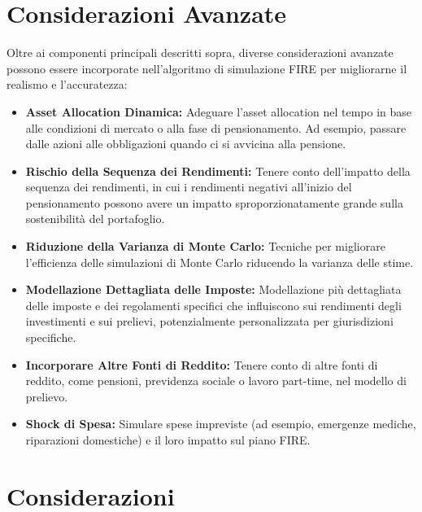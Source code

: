\documentclass{article}
\begin{document}
    \section{Considerazioni Avanzate}\label{sec:considerazioni-avanzate}

Oltre ai componenti principali descritti sopra, diverse considerazioni avanzate
possono essere incorporate nell'algoritmo di simulazione FIRE per migliorarne il
realismo e l'accuratezza:
    \begin{itemize}
        \item \textbf{Asset Allocation Dinamica:} Adeguare l'asset allocation
        nel tempo in base alle condizioni di mercato o alla fase di
        pensionamento.
        Ad esempio, passare dalle azioni alle obbligazioni quando
        ci si avvicina alla pensione.
        \item \textbf{Rischio della Sequenza dei Rendimenti:} Tenere conto
        dell'impatto della sequenza dei rendimenti, in cui i rendimenti negativi
        all'inizio del pensionamento possono avere un impatto
        sproporzionatamente grande sulla sostenibilità del portafoglio.
        \item \textbf{Riduzione della Varianza di Monte Carlo:} Tecniche per
        migliorare l'efficienza delle simulazioni di Monte Carlo riducendo la
        varianza delle stime.
        \item \textbf{Modellazione Dettagliata delle Imposte:} Modellazione più
        dettagliata delle imposte e dei regolamenti specifici che influiscono
        sui rendimenti degli investimenti e sui prelievi, potenzialmente
        personalizzata per giurisdizioni specifiche.
        \item \textbf{Incorporare Altre Fonti di Reddito:} Tenere conto di altre
        fonti di reddito, come pensioni, previdenza sociale o lavoro part-time,
        nel modello di prelievo.
        \item \textbf{Shock di Spesa:} Simulare spese impreviste (ad esempio,
        emergenze mediche, riparazioni domestiche) e il loro impatto sul piano
        FIRE\@.
    \end{itemize}

    \section{Considerazioni}\label{sec:considerazioni2}
\end{document}
